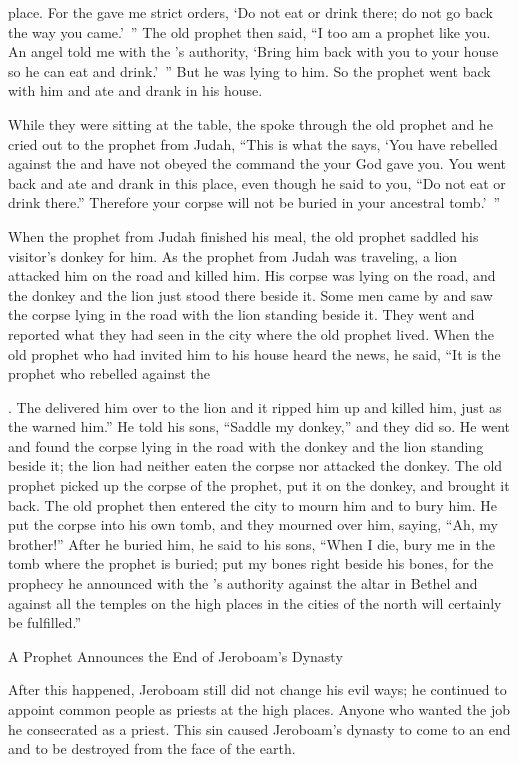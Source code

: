 {place.
For
the
{}
gave me
strict orders, ‘Do not
eat
or
drink
there;
do not
go
back
the way
you came.’ ”
The old prophet then said, “I
too
am a prophet
like
you. An angel
told
me with the
{}’s
authority, ‘Bring
him back
with
you to
your house
so he can eat
and drink.’ ”
But he was lying to him.
So the prophet went back
with
him and ate
and drank
in his house.
\par }{\PP {}While
they
were sitting
at the table,
the {}
spoke
through the old prophet
and he cried
out to
the prophet
from Judah,
“This is what
the {}
says,
‘You have
rebelled
against the
{}
and have not
obeyed
the
command
the {}
your God
gave you.
You went back
and ate
and drank
in this place,
even though he said
to
you, “Do not
eat
or
drink
there.” Therefore your corpse
will not
be buried
in your ancestral
tomb.’ ”
\par }{\PP {}When
the prophet from Judah finished
his meal,
the old prophet
saddled
his visitor’s donkey for him.
As the prophet from Judah was traveling,
a lion
attacked him
on the road
and killed
him. His corpse
was lying
on the road,
and the donkey
and the lion
just stood
there beside
it.
Some
men
came by
and saw
the corpse
lying
in the road
with the
lion
standing
beside
it.
They went
and reported what
they had seen in the city
where
the old
prophet
lived.
When the old prophet
who had
invited him to his house heard
the news, he said,
“It is
the prophet
who
rebelled
against the

{}. The
{}
delivered
him over to the lion
and it ripped
him up and killed
him, just
as the
{}
warned him.”
He told
his sons,
“Saddle
my donkey,”
and they did so.
He went
and found
the
corpse
lying
in the road
with the donkey
and the lion
standing
beside
it;
the lion
had
neither
eaten
the corpse
nor
attacked the
donkey.
The old prophet
picked
up the corpse
of the prophet,
put
it on the donkey,
and brought it back.
The old
prophet
then entered
the city
to
mourn
him and to bury him.
He put
the corpse
into his own tomb,
and they mourned
over
him, saying, “Ah,
my brother!”
After
he buried
him, he said
to
his sons,
“When I die,
bury
me in the
tomb
where
the prophet
is buried;
put
my bones
right beside
his bones,
for
the prophecy
he announced
with the
{}’s
authority against
the altar
in Bethel
and against
all
the temples
on the high places
in the cities
of the north
will certainly be
fulfilled.”
\par }{\SH A Prophet Announces the End of Jeroboam’s Dynasty
\par }{\PP {}After
this
happened,
Jeroboam
still did not
change
his evil
ways;
he continued
to appoint common
people
as priests
at the high places.
Anyone who wanted
the job he consecrated
as a priest.
This
sin
caused
Jeroboam’s
dynasty
to come to an end and to be destroyed
from the face
of the earth.

}
